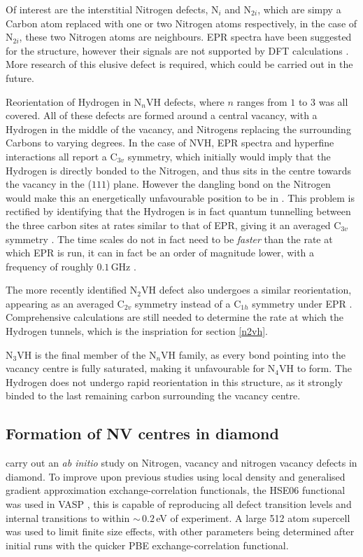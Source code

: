 \documentclass[10pt,a4paper,twocolumn,twoside]{extarticle}
\begin{document}
Of interest are the interstitial Nitrogen defects, N$_i$ and N$_{2i}$, which are simpy a Carbon atom replaced with one or two Nitrogen atoms respectively, in the case of N$_{2i}$, these two Nitrogen atoms are neighbours. EPR spectra have been suggested for the structure, however their signals are not supported by DFT calculations \cite{Atumi_2013}. More research of this elusive defect is required, which could be carried out in the future.

Reorientation of Hydrogen in N$_n$VH defects, where $n$ ranges from $1$ to $3$ was all covered. All of these defects are formed around a central vacancy, with a Hydrogen in the middle of the vacancy, and Nitrogens replacing the surrounding Carbons to varying degrees. In the case of NVH, EPR spectra and hyperfine interactions all report a C$_{3v}$ symmetry, which initially would imply that the Hydrogen is directly bonded to the Nitrogen, and thus sits in the centre towards the vacancy in the ($1 1 1$) plane. However the dangling bond on the Nitrogen would make this an energetically unfavourable position to be in \cite{Goss_NVH}. This problem is rectified by identifying that the Hydrogen is in fact quantum tunnelling between the three carbon sites at rates similar to that of EPR, giving it an averaged C$_{3v}$ symmetry \cite{Shaw_QT_VH}. The time scales do not in fact need to be \emph{faster} than the rate at which EPR is run, it can in fact be an order of magnitude lower, with a frequency of roughly $0.1$\,GHz \cite{Edwards_N2VH_rate}.

The more recently identified N$_{2}$VH defect also undergoes a similar reorientation, appearing as an averaged C$_{2v}$ symmetry instead of a C$_{1h}$ symmetry under EPR \cite{Peaker}. Comprehensive calculations are still needed to determine the rate at which the Hydrogen tunnels, which is the inspriation for section \ref{n2vh}. 

N$_{3}$VH is the final member of the N$_{n}$VH family, as every bond pointing into the vacancy centre is fully saturated, making it unfavourable for N$_{4}$VH to form. The Hydrogen does not undergo rapid reorientation in this structure, as it strongly binded to the last remaining carbon surrounding the vacancy centre. 

\subsection{Formation of NV centres in diamond}
\textcite{Deak} carry out an \emph{ab initio} study on Nitrogen, vacancy and nitrogen vacancy defects in diamond. To improve upon previous studies using local density and generalised gradient approximation exchange-correlation functionals, the HSE$06$ functional \cite{HSE06} was used in VASP \cite{VASP}, this is capable of reproducing all defect transition levels and internal transitions to within ${\sim}\,0.2$\,eV of experiment. A large 512 atom supercell was used to limit finite size effects, with other parameters being determined after initial runs with the quicker PBE exchange-correlation functional. 
\end{document}
